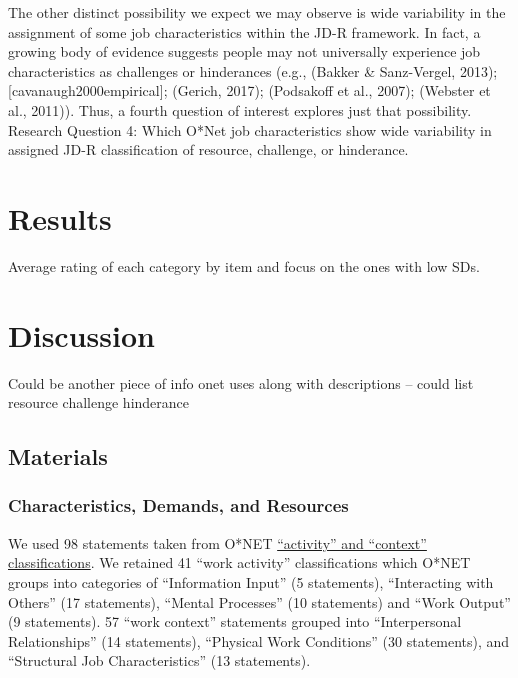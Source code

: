 \documentclass[
  english,
  man]{apa6}
\begin{document}
The other distinct possibility we expect we may observe is wide variability in the assignment of some job characteristics within the JD-R framework. In fact, a growing body of evidence suggests people may not universally experience job characteristics as challenges or hinderances (e.g., (Bakker \& Sanz-Vergel, 2013); {[}cavanaugh2000empirical{]}; (Gerich, 2017); (Podsakoff et al., 2007); (Webster et al., 2011)). Thus, a fourth question of interest explores just that possibility.
Research Question 4: Which O*Net job characteristics show wide variability in assigned JD-R classification of resource, challenge, or hinderance.

\hypertarget{results}{%
\section{Results}\label{results}}

Average rating of each category by item and focus on the ones with low SDs.

\hypertarget{discussion}{%
\section{Discussion}\label{discussion}}

Could be another piece of info onet uses along with descriptions -- could list resource challenge hinderance

\hypertarget{materials}{%
\subsection{Materials}\label{materials}}

\hypertarget{characteristics-demands-and-resources}{%
\subsubsection{Characteristics, Demands, and Resources}\label{characteristics-demands-and-resources}}

We used 98 statements taken from O*NET \href{https://www.O*NETonline.org/find/descriptor/result/4.A.1.b.3}{\enquote{activity} and \enquote{context} classifications}. We retained 41 \enquote{work activity} classifications which O*NET groups into categories of \enquote{Information Input} (5 statements), \enquote{Interacting with Others} (17 statements), \enquote{Mental Processes} (10 statements) and \enquote{Work Output} (9 statements). 57 \enquote{work context} statements grouped into \enquote{Interpersonal Relationships} (14 statements), \enquote{Physical Work Conditions} (30 statements), and \enquote{Structural Job Characteristics} (13 statements).
\end{document}
